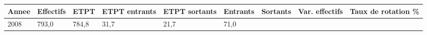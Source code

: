 \begin{longtable}[]{@{}lllllllll@{}}
\toprule
\begin{minipage}[b]{0.05\columnwidth}\raggedright
Annee\strut
\end{minipage} & \begin{minipage}[b]{0.08\columnwidth}\raggedright
Effectifs\strut
\end{minipage} & \begin{minipage}[b]{0.05\columnwidth}\raggedright
ETPT\strut
\end{minipage} & \begin{minipage}[b]{0.10\columnwidth}\raggedright
ETPT entrants\strut
\end{minipage} & \begin{minipage}[b]{0.10\columnwidth}\raggedright
ETPT sortants\strut
\end{minipage} & \begin{minipage}[b]{0.07\columnwidth}\raggedright
Entrants\strut
\end{minipage} & \begin{minipage}[b]{0.07\columnwidth}\raggedright
Sortants\strut
\end{minipage} & \begin{minipage}[b]{0.11\columnwidth}\raggedright
Var. effectifs\strut
\end{minipage} & \begin{minipage}[b]{0.14\columnwidth}\raggedright
Taux de rotation \%\strut
\end{minipage}\tabularnewline
\midrule
\endhead
\begin{minipage}[t]{0.05\columnwidth}\raggedright
2008\strut
\end{minipage} & \begin{minipage}[t]{0.08\columnwidth}\raggedright
793,0\strut
\end{minipage} & \begin{minipage}[t]{0.05\columnwidth}\raggedright
784,8\strut
\end{minipage} & \begin{minipage}[t]{0.10\columnwidth}\raggedright
31,7\strut
\end{minipage} & \begin{minipage}[t]{0.10\columnwidth}\raggedright
21,7\strut
\end{minipage} & \begin{minipage}[t]{0.07\columnwidth}\raggedright
71,0\strut
\end{minipage} & \begin{minipage}[t]{0.07\columnwidth}\raggedright

\end{minipage}
\end{longtable}
